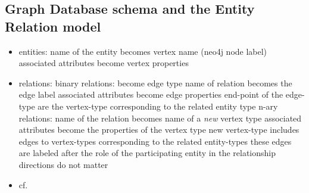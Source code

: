 	\subsection{Graph Database schema and the Entity Relation model}
	\begin{itemize}
	\item entities:
		\subitem name of the entity becomes vertex name (neo4j node label)
		\subitem associated attributes become vertex properties
	\item relations:
		\subitem binary relations:
			\subsubitem become edge type
			\subsubitem name of relation becomes the edge label
			\subsubitem associated attributes become edge properties
			\subsubitem end-point of the edge-type are the vertex-type corresponding to the related entity type
		\subitem n-ary relations:
			\subsubitem name of the relation becomes name of a \emph{new} vertex type
			\subsubitem associated attributes become the properties of the vertex type
			\subsubitem new vertex-type includes edges to vertex-types corresponding to the related entity-types
			\subsubitem these edges are labeled after the role of the participating entity in the relationship
			\subsubitem directions do not matter
	\item cf. \cite{Siriwaradhana2014}
	\end{itemize}
	
